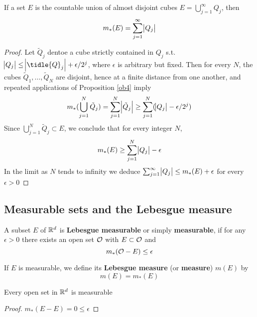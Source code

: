 \documentclass[11pt]{article}
\begin{document}
\begin{proposition}[]
If a set \(E\) is the countable union of almost disjoint cubes
\(E=\bigcup_{j=1}^\infty Q_j\), then
\begin{equation*}
m_*(E)=\displaystyle\sum_{j=1}^\infty\abs{Q_j}
\end{equation*}
\end{proposition}

\begin{proof}
Let \(\tilde{Q}_j\) dentoe a cube strictly contained in \(Q_j\) s.t.
\(\abs{Q_j}\le\abs{\tidle{Q}_j}+\epsilon/2^{j}\), where \(\epsilon\) is arbitrary
but fixed. Then for every \(N\), the cubes \(\tilde{Q}_1,\dots,\tilde{Q}_N\) are
disjoint, hence at a finite distance from one another, and repeated 
applications of Proposition \ref{ob4} imply
\begin{equation*}
m_*(\displaystyle\bigcup_{j=1}^N\tilde{Q}_j)=\displaystyle\sum_{j=1}^N
\abs{\tilde{Q}_j}\ge \displaystyle\sum_{j=1}^N(\abs{Q_j}-\epsilon/2^j)
\end{equation*}
Since \(\bigcup_{j=1}^N\tilde{Q}_j\subset E\), we conclude that for every
integer \(N\),
\begin{equation*}
m_*(E)\ge \displaystyle\sum_{j=1}^N\abs{Q_j}-\epsilon
\end{equation*}
In the limit as \(N\) tends to infinity we deduce
\(\sum_{j=1}^\infty\abs{Q_j}\le m_*(E)+\epsilon\) for every \(\epsilon>0\)
\end{proof}
\subsection{Measurable sets and the Lebesgue measure}
\label{sec:org34cb8ba}
\begin{definition}[]
A subset \(E\) of \(\mathbb{R}^d\) is \textbf{Lebesgue measurable} or simply \textbf{measurable}, if for
any \(\epsilon>0\) there exists an open set \(\mathcal{O}\) with \(E\subset\mathcal{O}\) and
\begin{equation*}
m_*(\mathcal{O}-E)\le\epsilon
\end{equation*}

If \(E\) is measurable, we define its \textbf{Lebesgue measure} (or \textbf{measure}) \(m(E)\) by
\begin{equation*}
m(E)=m_*(E)
\end{equation*}
\end{definition}

\begin{proposition}[]
Every open set in \(\mathbb{R}^d\) is measurable
\end{proposition}
\begin{proof}
\(m_*(E-E)=0\le\epsilon\)
\end{proof}
\end{document}
